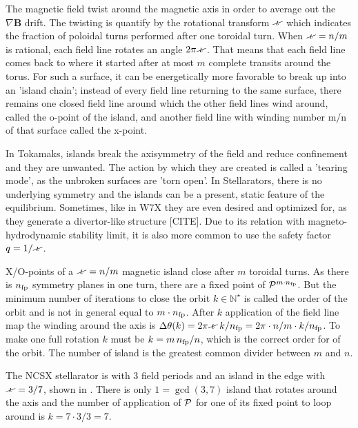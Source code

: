The magnetic field twist around the magnetic axis in order to average out the $\nabla\textbf{B}$ drift. The twisting is quantify by the rotational transform $\iotaslash$ which indicates the fraction of poloidal turns performed after one toroidal turn. When $\iotaslash = n/m$ is rational, each field line rotates an angle $2\pi\iotaslash$. That means that each field line comes back to where it started after at most $m$ complete transits around the torus. For such a surface, it can be energetically more favorable to break up into an 'island chain'; instead of every field line returning to the same surface, there remains one closed field line around which the other field lines wind around, called the o-point of the island, and another field line with winding number m/n of that surface called the x-point. 

In Tokamaks, islands break the axisymmetry of the field and reduce confinement and they are unwanted. The action by which they are created is called a 'tearing mode', as the unbroken surfaces are 'torn open'. In Stellarators, there is no underlying symmetry and the islands can be a present, static feature of the equilibrium. Sometimes, like in W7X they are even desired and optimized for, as they generate a divertor-like structure [CITE]. Due to its relation with magneto-hydrodynamic stability limit, it is also more common to use the safety factor $q=1/\iotaslash$.

X/O-points of a $\iotaslash = n/m$ magnetic island close after $m$ toroidal turns. As there is $n_\text{fp}$ symmetry planes in one turn, there are a fixed point of $\mathcal{P}^{m\cdot n_\text{fp}}$. But the minimum number of iterations to close the orbit $k\in\mathbb{N}^\star$ is called the order of the orbit and is not in general equal to $m\cdot n_\text{fp}$. After $k$ application of the field line map the winding around the axis is $\Delta\theta(k) = 2\pi\iotaslash\,k/\nfp = 2\pi\cdot n/m \cdot k/\nfp$. To make one full rotation $k$ must be $k = m\,n_\text{fp}/n$, which is the correct order for of the orbit. The number of island is the greatest common divider between $m$ and $n$.

The NCSX stellarator is with 3 field periods and an island in the edge with $\iotaslash = 3/7$, shown in . There is only $1 = \gcd(3,7)$ island that rotates around the axis and the number of application of $\mathcal{P}$ for one of its fixed point to loop around is $k = 7\cdot3/3 = 7$.

